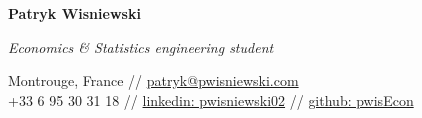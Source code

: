 \documentclass[11pt]{report}
\begin{document}
\hspace*{-\parindent}\hspace{-1em}
\begin{center}\vspace{-1cm}
\begin{Large}\textbf{Patryk Wisniewski\\}\end{Large}
\emph{Economics \& Statistics engineering student}
\end{center}\vspace{0cm}
	 \begin{center}
	 Montrouge, France //
	 \href{mailto:patryk@pwisniewski.com}{patryk@pwisniewski.com} 
	 \\
	 +33 6 95 30 31 18 
	 //
	 \href{https://linkedin.com/in/pwisniewski02}{linkedin: pwisniewski02}
	 //
	 \href{https://github.com/pwisEcon}{github: pwisEcon} 
	\end{center}	  

	 


\end{document}

